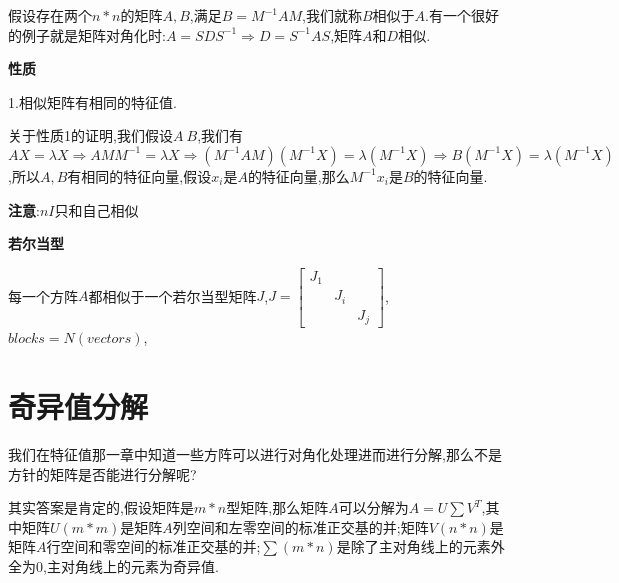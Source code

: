 \documentclass[oneside]{book}
\begin{document}
	假设存在两个$n*n$的矩阵$A,B$,满足$B=M^{-1}AM$,我们就称$B$相似于$A$.有一个很好的例子就是矩阵对角化时:$A=SDS^{-1}\Rightarrow D=S^{-1}AS$,矩阵$A$和$D$相似.
	
	\textbf{性质}
	
	1.相似矩阵有相同的特征值.
	
	关于性质1的证明,我们假设$A~B$,我们有$AX=\lambda X\Rightarrow AMM^{-1}=\lambda X\Rightarrow (M^{-1}AM)(M^{-1}X)=\lambda (M^{-1}X)\Rightarrow B(M^{-1}X)=\lambda(M^{-1}X)$,所以$A,B$有相同的特征向量,假设$x_{i}$是$A$的特征向量,那么$M^{-1}x_{i}$是$B$的特征向量.
	
	\textbf{注意}:$nI$只和自己相似
	
	\textbf{若尔当型}
	
	每一个方阵$A$都相似于一个若尔当型矩阵$J$,$J=\left[\begin{array}{ccc}
		J_{1}&\ &\ \\\ &J_{i}&\ \\\ &\ &J_{j}  
	\end{array}\right]$,$blocks=N(vectors)$,
	\chapter{奇异值分解}
	我们在特征值那一章中知道一些方阵可以进行对角化处理进而进行分解,那么不是方针的矩阵是否能进行分解呢?
	
	其实答案是肯定的,假设矩阵是$m*n$型矩阵,那么矩阵$A$可以分解为$A=U\sum V^{T}$,其中矩阵$U(m*m)$是矩阵$A$列空间和左零空间的标准正交基的并;矩阵$V(n*n)$是矩阵$A$行空间和零空间的标准正交基的并;$\sum(m*n)$是除了主对角线上的元素外全为0,主对角线上的元素为奇异值.
	
\end{document}
